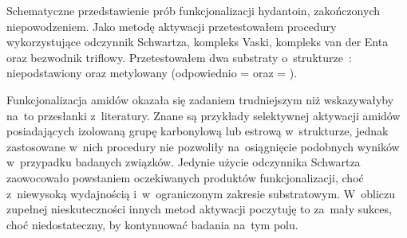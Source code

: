 \begin{marginscheme}
  
  \caption{
    Schematyczne przedstawienie prób funkcjonalizacji hydantoin, zakończonych niepowodzeniem.
    Jako metodę aktywacji przetestowałem procedury wykorzystujące odczynnik Schwartza,
      kompleks Vaski, kompleks van der Enta oraz bezwodnik triflowy.
    Przetestowałem dwa substraty o~strukturze~:
      niepodstawiony oraz metylowany (odpowiednio  =  oraz  = ).
  }\label{sch:hydantoin-attempt}
\end{marginscheme}

Funkcjonalizacja  amidów okazała się zadaniem trudniejszym
  niż wskazywałyby na~to przesłanki z~literatury.
Znane są przykłady selektywnej aktywacji amidów posiadających izolowaną grupę karbonylową
  lub estrową w~strukturze, jednak zastosowane w~nich procedury nie pozwoliły na~osiągnięcie
  podobnych wyników w~przypadku badanych związków.
Jedynie użycie odczynnika Schwartza zaowocowało powstaniem oczekiwanych produktów
  funkcjonalizacji, choć z~niewysoką wydajnością i~w~ograniczonym zakresie substratowym.
W~obliczu zupełnej nieskuteczności innych metod aktywacji poczytuję to za~mały sukces,
  choć niedostateczny, by kontynuować badania na~tym polu.
